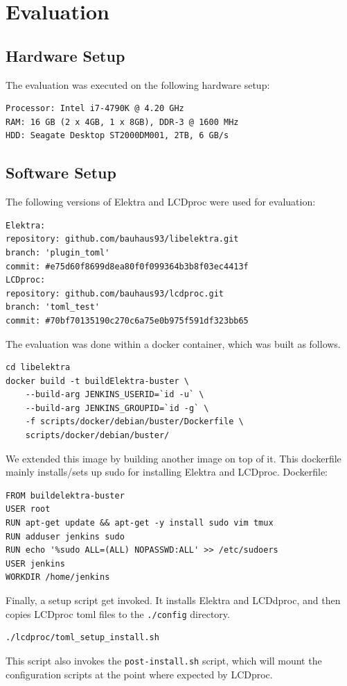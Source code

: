 \documentclass[draft,final]{vutinfth} %
\begin{document}
\chapter{Evaluation}

\section{Hardware Setup}
The evaluation was executed on the following hardware setup:
\begin{Verbatim}[frame=single]
Processor: Intel i7-4790K @ 4.20 GHz
RAM: 16 GB (2 x 4GB, 1 x 8GB), DDR-3 @ 1600 MHz 
HDD: Seagate Desktop ST2000DM001, 2TB, 6 GB/s
\end{Verbatim}

\section{Software Setup}

The following versions of Elektra and LCDproc were used for evaluation:
\begin{Verbatim}[frame=single]
Elektra:
repository: github.com/bauhaus93/libelektra.git
branch: 'plugin_toml'
commit: #e75d60f8699d8ea80f0f099364b3b8f03ec4413f
LCDproc:
repository: github.com/bauhaus93/lcdproc.git
branch: 'toml_test'
commit: #70bf70135190c270c6a75e0b975f591df323bb65
\end{Verbatim}


The evaluation was done within a docker container, which was built as follows.
\begin{Verbatim}[frame=single]
cd libelektra
docker build -t buildElektra-buster \
    --build-arg JENKINS_USERID=`id -u` \
    --build-arg JENKINS_GROUPID=`id -g` \
    -f scripts/docker/debian/buster/Dockerfile \
    scripts/docker/debian/buster/
\end{Verbatim}

We extended this image by building another image on top of it. This dockerfile mainly installs/sets up sudo for installing Elektra and LCDproc.
Dockerfile:
\begin{Verbatim}[frame=single]
FROM buildelektra-buster
USER root
RUN apt-get update && apt-get -y install sudo vim tmux
RUN adduser jenkins sudo
RUN echo '%sudo ALL=(ALL) NOPASSWD:ALL' >> /etc/sudoers
USER jenkins
WORKDIR /home/jenkins
\end{Verbatim}

Finally, a setup script get invoked. It installs Elektra and LCDdproc, and then copies LCDproc \acrshort{toml} files to the \texttt{./config} directory.
\begin{Verbatim}[frame=single]
./lcdproc/toml_setup_install.sh
\end{Verbatim}
This script also invokes the \texttt{post-install.sh} script, which will mount the configuration scripts at the point where expected by LCDproc.
\end{document}
